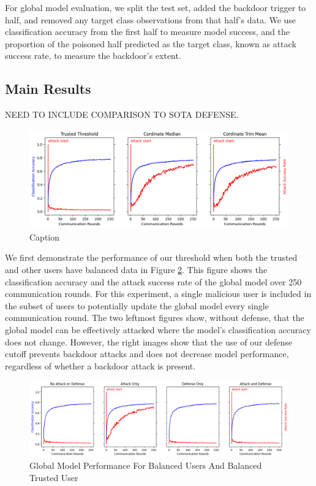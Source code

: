 \documentclass{article} %
\begin{document}
For global model evaluation, we split the test set, added the backdoor trigger to half, and removed any target class observations from that half's data. We use classification accuracy from the first half to measure model success, and the proportion of the poisoned half predicted as the target class, known as attack success rate, to measure the backdoor's extent.


%
\subsection{Main Results}

NEED TO INCLUDE COMPARISON TO SOTA DEFENSE.
\begin{figure}[H]
    \centering
    \includegraphics[width=.75\textwidth]{01_trusted/centralized/alpha10000--alpha_val10000/visuals/baseline--n_malicious1.png}
    \caption{Caption}
    \label{fig:my_label}
\end{figure}

We first demonstrate the performance of our threshold when both the trusted and other users have balanced data in Figure \ref{fig:centralized--alpha10000--alpha_val10000--accuracy--n_malicious1--m_start1}. This figure shows the classification accuracy and the attack success rate of the global model over 250 communication rounds. For this experiment, a single malicious user is included in the subset of users to potentially update the global model every single communication round. The two leftmost figures show, without defense, that the global model can be effectively attacked where the model's classification accuracy does not change. However, the right images show that the use of our defense cutoff prevents backdoor attacks and does not decrease model performance, regardless of whether a backdoor attack is present. 

\begin{figure}[H]
    \centering
    \includegraphics[width=\textwidth]{01_trusted/centralized/alpha10000--alpha_val10000/visuals/accuracy--n_malicious1--m_start1.png}
    \caption{Global Model Performance For Balanced Users And Balanced Trusted User}
    \label{fig:centralized--alpha10000--alpha_val10000--accuracy--n_malicious1--m_start1}
\end{figure}
\end{document}
